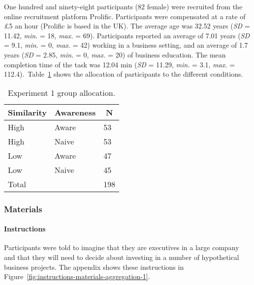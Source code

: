 \documentclass[a4paper, nobind]{templates/ociamthesis}
\theoremstyle{definition}
\theoremstyle{definition}
\theoremstyle{definition}
\theoremstyle{definition}
\theoremstyle{remark}
\begin{document}
One hundred and ninety-eight participants (82 female) were recruited from the online recruitment platform Prolific. Participants were compensated at a rate of \pounds 5 an hour (Prolific is based in the UK). The average age was 32.52 years (\emph{SD} = 11.42, \emph{min.} = 18, \emph{max.} = 69). Participants reported an average of 7.01 years (\emph{SD} = 9.1, \emph{min.} = 0, \emph{max.} = 42) working in a business setting, and an average of 1.7 years (\emph{SD} = 2.85, \emph{min.} = 0, \emph{max.} = 20) of business education. The mean completion time of the task was 12.04 min (\emph{SD} = 11.29, \emph{min.} = 3.1, \emph{max.} = 112.4).~Table~\ref{tab:condition-allocation-aggregation-1}
shows the allocation of participants to the different conditions.

\begin{table}[tbp]

\begin{center}
\begin{threeparttable}

\caption{\label{tab:condition-allocation-aggregation-1}Experiment 1 group allocation.}

\begin{tabular}{lll}
\toprule
Similarity & \multicolumn{1}{c}{Awareness} & \multicolumn{1}{c}{N}\\
\midrule
High & Aware & 53\\
High & Naive & 53\\
Low & Aware & 47\\
Low & Naive & 45\\
Total &  & 198\\
\bottomrule
\end{tabular}

\end{threeparttable}
\end{center}

\end{table}

\subsubsection{Materials}

\hypertarget{instructions-materials-aggregation-1}{%
\paragraph{Instructions}\label{instructions-materials-aggregation-1}}

Participants were told to imagine that they are executives in a large company
and that they will need to decide about investing in a number of hypothetical
business projects. The appendix shows these instructions in
Figure~\ref{fig:instructions-materials-aggregation-1}.
\end{document}
